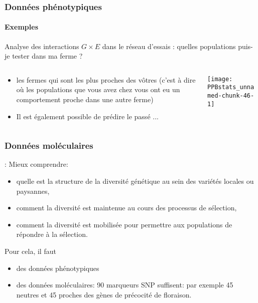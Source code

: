 \begin{frame}
\frametitle{Données phénotypiques}
\framesubtitle{Exemples}

Analyse des interactions $G \times E $ dans le réseau d'essais :  quelles populations puis-je tester dans ma ferme ?

\begin{columns}

\begin{column}{.4\textwidth}
\begin{itemize}
\item les fermes qui sont les plus proches des vôtres (c'est à dire où les populations que vous avez chez vous ont eu un comportement proche dans une autre ferme)
\item Il est également possible de prédire le passé ...
\end{itemize}
\end{column}

\begin{column}{.6\textwidth}
\begin{center} \texttt{[image: PPBstats\_unnamed-chunk-46-1]} \tiny \cite{PPBstats_unnamed-chunk-46-1}\end{center}
\end{column}

\end{columns}


\end{frame}


\begin{frame}
\frametitle{Données moléculaires}

: Mieux comprendre:

\begin{itemize}
\item quelle est la structure de la diversité génétique au sein des variétés locales ou paysannes,
\item comment la diversité est maintenue au cours des processus de sélection,
\item comment la diversité est mobilisée pour permettre aux populations de répondre à la sélection.
\end{itemize}

Pour cela, il faut
\begin{itemize}
\item des données phénotypiques
\item des données moléculaires: 90 marqueurs SNP suffisent: par exemple 45 neutres et 45 proches des gènes de précocité de floraison.
\end{itemize}



\end{frame}


